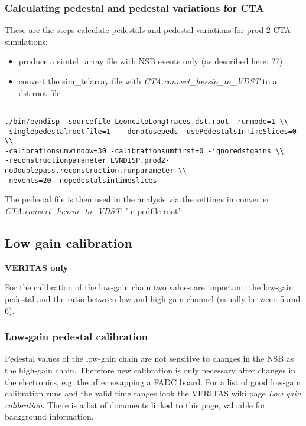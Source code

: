 \documentclass[titlepage,a4paper,twoside,11pt]{report}
\begin{document}
\subsubsection{Calculating pedestal and pedestal variations for CTA}

These are the steps calculate pedestals and pedestal variations for prod-2 CTA simulations:

\begin{itemize}
\item produce a simtel\_array file with NSB events only (as described here: ??)
\item convert the sim\_telarray file with {\it CTA.convert\_hessio\_to\_VDST} to a dst.root file
\end{itemize}

\begin{lstlisting}

./bin/evndisp -sourcefile LeoncitoLongTraces.dst.root -runmode=1 \\
-singlepedestalrootfile=1   -donotusepeds -usePedestalsInTimeSlices=0 \\ 
-calibrationsumwindow=30 -calibrationsumfirst=0 -ignoredstgains \\ 
-reconstructionparameter EVNDISP.prod2-noDoublepass.reconstruction.runparameter \\
-nevents=20 -nopedestalsintimeslices 

\end{lstlisting}

The pedestal file is then used in the analysis via the settings in converter {\it CTA.convert\_hessio\_to\_VDST}: '-c pedfile.root'

\subsection{Low gain calibration}

{\bf\color{red}VERITAS only}

For the calibration of the low-gain chain two values are important: the low-gain pedestal and the ratio between low and high-gain channel (usually between 5 and 6).

\subsubsection{Low-gain pedestal calibration}

Pedestal values of the low-gain chain are not sensitive to changes in the NSB as the high-gain chain.
Therefore new calibration is only necessary after changes in the electronics, e.g. the after swapping a FADC board.
For a list of good low-gain calibration runs and the valid time ranges look the VERITAS wiki page {\it Low gain calibration}.
There is a list of documents linked to this page, valuable for background information.
\end{document}
